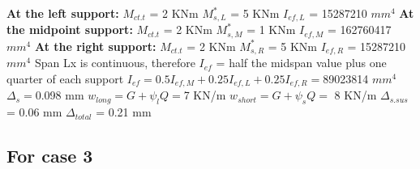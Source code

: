 \documentclass{article}%
\begin{document}
%
\newline%
\newline%
%
\textbf{At the left support:}%
\newline%
\newline%
%
$M_{ct.t}$ = 2 KNm%
\newline%
%
$M_{s,L}^{*}$ = 5 KNm%
\newline%
%
$I_{ef,L}$ = 15287210 $mm^{4}$%
\newline%
\newline%
%
\textbf{At the midpoint support:}%
\newline%
\newline%
%
$M_{ct.t}$ = 2 KNm%
\newline%
%
$M_{s,M}^{*}$ = 1 KNm%
\newline%
%
$I_{ef,M}$ = 162760417 $mm^{4}$%
\newline%
\newline%
%
\textbf{At the right support:}%
\newline%
\newline%
%
$M_{ct.t}$ = 2 KNm%
\newline%
%
$M_{s,R}^{*}$ = 5 KNm%
\newline%
%
$I_{ef,R}$ = 15287210 $mm^{4}$%
\newline%
\newline%
%
Span Lx is continuous, therefore $I_{ef}$ = half the midspan value plus one quarter of each support%
\newline%
\newline%
%
$I_{ef} = 0.5I_{ef,M} + 0.25I_{ef,L} + 0.25I_{ef,R} = $89023814 $ mm^{4}$%
\newline%
\newline%
%
$\Delta_{s} =$0.098 mm%
\newline%
\newline%
%
$w_{long} = G + \psi_{l}Q = $7 KN/m%
\newline%
%
$w_{short} = G + \psi_{s}Q = $ 8 KN/m%
\newline%
\newline%
%
$\Delta_{s.sus}$ = 0.06 mm%
\newline%
\newline%
%
$\Delta_{total}$ = 0.21 mm%
\subsection*{For case 3}%
\label{subsec:Forcase3}%
\end{document}

